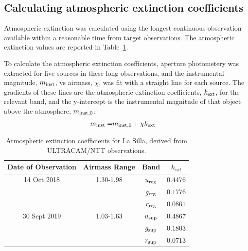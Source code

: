 \subsection{Calculating atmospheric extinction coefficients}
\label{sect:calcualting atmospheric extinction}

Atmospheric extinction was calculated using the longest continuous observation available within a reasonable time from target observations.
The atmospheric extinction values are reported in Table~\ref{table:atmos_extinction}.

To calculate the atmospheric extinction coefficients, aperture photometery was extracted for five sources in these long observations, and the instrumental magnitude, $m_{\rm inst}$, vs airmass, $\chi$, was fit with a straight line for each source. 
The gradients of these lines are the atmospheric extinction coefficients, $k_{\rm ext}$, for the relevant band, and the y-intercept is the instrumental magnitude of that object above the atmosphere, $m_{\rm inst,0}$:
\begin{align*}
    m_{\rm inst} =& m_{\rm inst,0} + \chi k_{\rm ext} 
\end{align*}

\begin{table}
    \centering
    \caption{Atmospheric extinction coefficients for La Silla, derived from ULTRACAM/NTT observations.}
    \label{table:atmos_extinction}
    \begin{tabular}{cccc}
        \hline
        Date of Observation & Airmass Range & Band & $k_{ext}$ \\
        \hline
        \hline
        14 Oct 2018   & 1.30-1.98 & $u_{\rm reg}$ & $0.4476$ \\
                      &           & $g_{\rm reg}$ & $0.1776$ \\
                      &           & $r_{\rm reg}$ & $0.0861$ \\
        \hline
        30 Sept 2019  & 1.03-1.63 & $u_{\rm sup}$ & $0.4867$ \\
                      &           & $g_{\rm sup}$ & $0.1803$ \\
                      &           & $r_{\rm sup}$ & $0.0713$ \\
        \hline
    \end{tabular}
\end{table}


